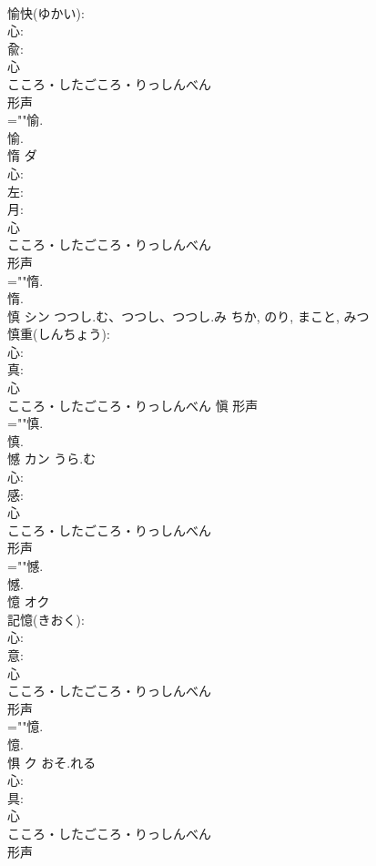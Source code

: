 \documentclass[8pt]{extreport}
\begin{document}
\begin{CJK}{UTF8}{min}
\\	愉快(ゆかい): 
\\	心: 
\\	兪: 
\\	心	
\\	こころ・したごころ・りっしんべん	
\\	形声 
\\	=""愉.
\\	愉.
\\	惰	ダ			
\\	心: 
\\	左: 
\\	月: 
\\	心	
\\	こころ・したごころ・りっしんべん	
\\	形声 
\\	=""惰.
\\	惰.
\\	慎	シン	つつし.む、つつし、つつし.み	ちか, のり, まこと, みつ	
\\	慎重(しんちょう): 
\\	心: 
\\	真: 
\\	心	
\\	こころ・したごころ・りっしんべん	愼	形声 
\\	=""慎.
\\	慎.
\\	憾	カン	うら.む		
\\	心: 
\\	感: 
\\	心	
\\	こころ・したごころ・りっしんべん	
\\	形声 
\\	=""憾.
\\	憾.
\\	憶	オク			
\\	記憶(きおく): 
\\	心: 
\\	意: 
\\	心	
\\	こころ・したごころ・りっしんべん	
\\	形声 
\\	=""憶.
\\	憶.
\\	惧	ク	おそ.れる		
\\	心: 
\\	具: 
\\	心	
\\	こころ・したごころ・りっしんべん	
\\	形声 

\end{CJK}
\end{document}
